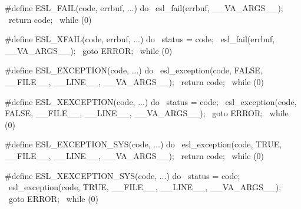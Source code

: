 \begin{cchunk}
#define ESL_FAIL(code, errbuf, ...) do {				\
    esl_fail(errbuf, __VA_ARGS__);                                      \
    return code; }							\
  while (0)

#define ESL_XFAIL(code, errbuf, ...) do {				\
    status = code;							\
    esl_fail(errbuf, __VA_ARGS__);                                      \
    goto ERROR; }							\
  while (0)

#define ESL_EXCEPTION(code, ...)  do {					\
    esl_exception(code, FALSE, __FILE__, __LINE__, __VA_ARGS__);	\
    return code; }							\
  while (0)

#define ESL_XEXCEPTION(code, ...)  do {					\
    status = code;							\
    esl_exception(code, FALSE, __FILE__, __LINE__, __VA_ARGS__);	\
    goto ERROR; }							\
  while (0)

#define ESL_EXCEPTION_SYS(code, ...) do {				\
    esl_exception(code, TRUE, __FILE__, __LINE__, __VA_ARGS__);		\
    return code; }							\
  while (0)

#define ESL_XEXCEPTION_SYS(code, ...)  do {				\
    status = code;							\
    esl_exception(code, TRUE, __FILE__, __LINE__, __VA_ARGS__);	\
    goto ERROR; }							\
  while (0)
\end{cchunk}
